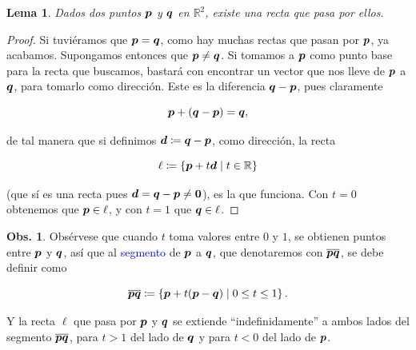 \documentclass{article}
\theoremstyle{definicion}
\theoremstyle{definition}             %
\theoremstyle{definition}             %
\theoremstyle{definition}
\theoremstyle{definition}
\theoremstyle{observacion}
\newtheorem{obs}{Obs.}
\theoremstyle{definition}
\theoremstyle{plain}
\newtheorem{lemma}{Lema}
\theoremstyle{definition}
\theoremstyle{afirmacion}
\theoremstyle{notation}
\theoremstyle{definition}
\begin{document}
    \begin{lemma}
        Dados dos puntos \(\vb*{p}\) y \(\vb*{q}\) en \(\mathbb{R}^{2}\), existe una recta que pasa por ellos.
    \end{lemma}
    \begin{proof}
        Si tuviéramos que \(\vb*{p} = \vb*{q}\), como  hay muchas rectas que pasan por \(\vb*{p}\), ya acabamos. Supongamos entonces que \(\vb*{p} \neq \vb*{q}\). Si tomamos a \(\vb*{p}\) como punto base para la recta que buscamos, bastará con encontrar un vector que nos lleve de \(\vb*{p}\) a \(\vb*{q}\), para tomarlo como dirección. Este es la diferencia \(\vb*{q} - \vb*{p}\), pues claramente

        \begin{equation*}
            \vb*{p} + (\vb*{q} - \vb*{p}) = \vb*{q},
        \end{equation*}

        de tal manera que si definimos \(\vb*{d} \coloneq \vb*{q} - \vb*{p}\), como dirección, la recta

        \begin{equation*}
            \ell \coloneq \left\lbrace \vb*{p} + t\vb*{d} \mid t \in \mathbb{R}\right\rbrace
        \end{equation*}

        (que sí es una recta pues \(\vb*{d} = \vb*{q} - \vb*{p} \neq \vb*{0}\)), es la que funciona. Con \(t = 0\) obtenemos que \(\vb*{p} \in \ell\), y con \(t = 1\) que \(\vb*{q} \in \ell\).
    \end{proof}

    \begin{obs}
        Obsérvese que cuando \(t\) toma valores entre \(0\) y \(1\), se obtienen puntos entre \(\vb*{p}\) y \(\vb*{q}\), así que al \textcolor{blue}{segmento} de \(\vb*{p}\) a \(\vb*{q}\), que denotaremos con \(\overline{\vb*{p}\vb*{q}}\), se debe definir como

        \begin{equation*}
            \overline{\vb*{p}\vb*{q}} \coloneq \left\lbrace \vb*{p} + t(\vb*{p} - \vb*{q}) \mid 0 \leq t \leq 1\right\rbrace.
        \end{equation*}

        Y la recta \(\ell\) que pasa por \(\vb*{p}\) y \(\vb*{q}\) se extiende ``indefinidamente'' a ambos lados del segmento \(\overline{\vb*{p}\vb*{q}}\), para \(t > 1\) del lado de \(\vb*{q}\) y para \(t < 0\) del lado de \(\vb*{p}\).
    \end{obs}
\end{document}
